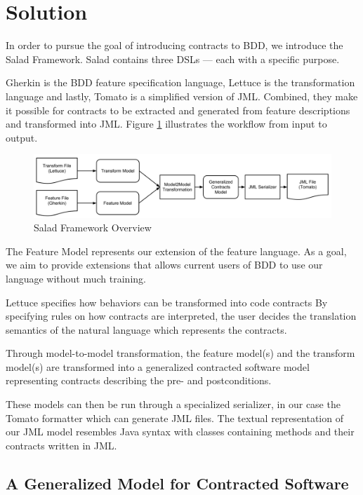 \section{Solution}
\label{sec:Solution}

In order to pursue the goal of introducing contracts to BDD, we introduce the Salad Framework. Salad contains three DSLs --- each with a specific purpose.

Gherkin is the BDD feature specification language, Lettuce is the transformation language and lastly, Tomato is a simplified version of JML.  Combined, they make it possible for contracts to be extracted and generated from feature descriptions and transformed into JML. Figure \ref{fig:saladoverview} illustrates the workflow from input to output.

\begin{figure}
  \begin{center}
    \includegraphics[scale=0.35]{images/framework_overview.png}
  \end{center}
  \caption{Salad Framework Overview}
  \label{fig:saladoverview}
\end{figure}

The Feature Model represents our extension of the feature language.
As a goal, we aim to provide extensions that allows current users of BDD to use
our language without much training.

Lettuce specifies how behaviors can be transformed into code contracts
By specifying rules on how contracts are interpreted, the user decides the translation semantics of the natural language which represents the contracts. 

Through model-to-model transformation, the feature model(s) and the transform model(s) are transformed into a generalized contracted software model representing contracts describing the pre- and postconditions. 

These models can then be run through a specialized serializer, in our case the Tomato formatter which can generate JML files.
The textual representation of our JML model resembles Java syntax with classes containing methods and their contracts written in JML. 

\subsection{A Generalized Model for Contracted Software}
\label{sub:AGeneralizedModelforContractedSoftware}

